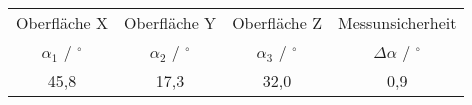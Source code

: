 \begin{tabular}{c|c|c|c}
    Oberfläche X & Oberfläche Y & Oberfläche Z & Messunsicherheit \\
    $\alpha_1$ / $^\circ$ & $\alpha_2$ / $^\circ$  & $\alpha_3$ / $^\circ$ & $\Delta \alpha$ / $^\circ$ \\ \hline 
    45,8 & 17,3 & 32,0 & 0,9
\end{tabular}